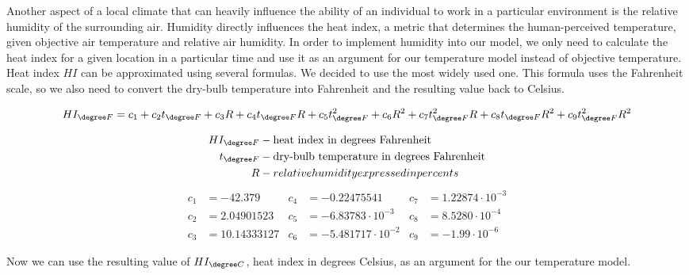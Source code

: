 Another aspect of a local climate that can heavily influence the ability of an individual to work in a particular environment is the relative humidity of the surrounding air. Humidity directly influences the heat index, a metric that determines the human-perceived temperature, given objective air temperature and relative air humidity. In order to implement humidity into our model, we only need to calculate the heat index for a given location in a particular time and use it as an argument for our temperature model instead of objective temperature. Heat index $HI$ can be approximated using several formulas. We decided to use the most widely used one. This formula uses the Fahrenheit scale, so we also need to convert the dry-bulb temperature into Fahrenheit and the resulting value back to Celsius.

$$HI_{\degree F}= c_1+c_{2}t_{\degree F}+c_{3}R+c_{4}t_{\degree F}R+c_{5}t_{\degree F}^2+c_{6}R^2+c_{7}t_{\degree F}^{2}R+c_{8}t_{\degree F}R^2+c_{9}t_{\degree F}^{2}R^2$$



\begin{align*}
HI_{\degree F} &- \text{heat index in degrees Fahrenheit}\\
t_{\degree F} &- \text{dry-bulb temperature in degrees Fahrenheit}\\
R &- relative humidity expressed in percents
\end{align*}
\begin{align*}
c_1 &= -42.379 & c_4 &= -0.22475541 & c_7 &= 1.22874 \cdot 10^{-3}\\
c_2 &= 2.04901523 & c_5 &= -6.83783 \cdot 10^{-3} & c_8 &= 8.5280 \cdot 10^{-4}\\
c_3 &= 10.14333127 & c_6 &= -5.481717 \cdot 10^{-2} & c_9 &= -1.99 \cdot 10^{-6}
\end{align*}

Now we can use the resulting value of $HI_{\degree C}$, heat index in degrees Celsius, as an argument for the our temperature model.
